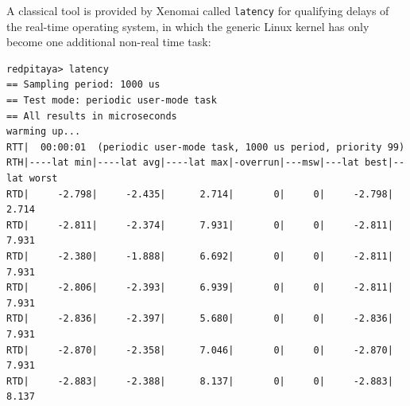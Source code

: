 \documentclass{article}
\begin{document}
{{%
%

A classical tool is provided by Xenomai called {\tt latency} for qualifying delays of the 
real-time operating system, in which the generic Linux kernel has only become one additional 
non-real time task:
\begin{verbatim}
redpitaya> latency 
== Sampling period: 1000 us
== Test mode: periodic user-mode task
== All results in microseconds
warming up...
RTT|  00:00:01  (periodic user-mode task, 1000 us period, priority 99)
RTH|----lat min|----lat avg|----lat max|-overrun|---msw|---lat best|--lat worst
RTD|     -2.798|     -2.435|      2.714|       0|     0|     -2.798|      2.714
RTD|     -2.811|     -2.374|      7.931|       0|     0|     -2.811|      7.931
RTD|     -2.380|     -1.888|      6.692|       0|     0|     -2.811|      7.931
RTD|     -2.806|     -2.393|      6.939|       0|     0|     -2.811|      7.931
RTD|     -2.836|     -2.397|      5.680|       0|     0|     -2.836|      7.931
RTD|     -2.870|     -2.358|      7.046|       0|     0|     -2.870|      7.931
RTD|     -2.883|     -2.388|      8.137|       0|     0|     -2.883|      8.137
\end{verbatim}

}}
\end{document}
